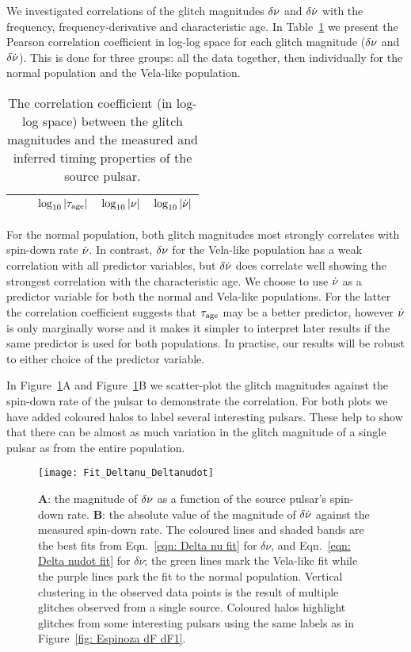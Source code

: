 \documentclass[../full_thesis/full_thesis.tex]{subfiles}
\newcommand{\thisdir}{../glitches_in_CGW}
\begin{document}
We investigated correlations of the
glitch magnitudes $\delta\nu$ and $\delta\dot{\nu}$ with the frequency,
frequency-derivative and characteristic age.
In Table~\ref{tab: correlation} we present the Pearson correlation coefficient
in log-log space for each glitch magnitude ($\delta\nu$ and $\delta\dot{\nu}$).
This is done for three groups:
all the data together, then individually for the normal population and the
Vela-like population.
\begin{table}[htb]
\begin{tabular}{l|l|ccc}
&  & $\log_{10}|\tau_{\mathrm{age}}|$ & $\log_{10}|\nu|$ & $\log_{10}|\dot{\nu}|$ \\\hline

\end{tabular}
\caption{The correlation coefficient (in log-log space) between the glitch
magnitudes and the measured and inferred timing properties of the source pulsar.}
\label{tab: correlation}
\end{table}
For the normal population, both glitch magnitudes most strongly correlates with
spin-down rate $\dot{\nu}$. In contrast, $\delta\nu$ for the Vela-like population has
a weak correlation with all predictor variables, but $\delta\dot{\nu}$ does
correlate well showing the strongest correlation with the characteristic age.
We choose to use $\dot{\nu}$ as a predictor variable for both the normal and
Vela-like populations. For the latter the correlation coefficient suggests that
$\tau_{\mathrm{age}}$ may be a better predictor, however $\dot{\nu}$ is only marginally
worse and it makes it simpler to interpret later results if the same predictor is
used for both populations. In practise, our results will be robust to either choice
of the predictor variable.

In Figure~\ref{fig: extrapolation fit}A  and Figure~\ref{fig: extrapolation fit}B
we scatter-plot
the glitch magnitudes against the spin-down rate of the pulsar to demonstrate the
correlation. For both plots we have added coloured
halos to label several interesting pulsars. These help to show that
there can be almost as much variation in the
glitch magnitude of a single pulsar as from the entire population.
\begin{figure}[htb]
\centering
\texttt{[image: Fit\_Deltanu\_Deltanudot]}
\caption{\textbf{A}: the magnitude of $\delta\nu$ as a function of the source
pulsar's spin-down rate. \textbf{B}: the absolute value of the magnitude of
$\delta\dot{\nu}$ against the measured spin-down rate. The coloured lines and shaded
bands are the best fits from Eqn.~\eqref{eqn: Delta nu fit} for $\delta\nu$,
and Eqn.~\eqref{eqn: Delta nudot fit} for $\delta \dot{\nu}$; the green lines
mark the Vela-like fit while the purple lines park the fit to the normal population.
Vertical clustering in the observed data points is the
result of multiple glitches observed from a single source. Coloured halos
highlight glitches from some interesting pulsars using the
same labels as in Figure~\ref{fig: Espinoza dF dF1}.}
\label{fig: extrapolation fit}
\end{figure}
\end{document}
